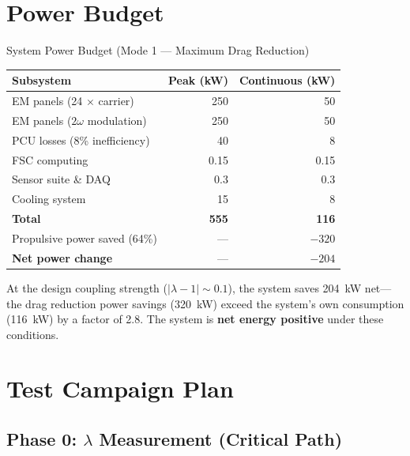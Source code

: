 \documentclass[11pt]{article}
\begin{document}
\section{Power Budget}
\label{sec:power}

\begin{specbox}{System Power Budget (Mode 1 --- Maximum Drag Reduction)}
\begin{tabular}{@{}lrr@{}}
\toprule
\textbf{Subsystem} & \textbf{Peak (kW)} & \textbf{Continuous (kW)} \\
\midrule
EM panels (24 $\times$ carrier) & 250 & 50 \\
EM panels ($2\omega$ modulation) & 250 & 50 \\
PCU losses (8\% inefficiency) & 40 & 8 \\
FSC computing & 0.15 & 0.15 \\
Sensor suite \& DAQ & 0.3 & 0.3 \\
Cooling system & 15 & 8 \\
\midrule
\textbf{Total} & \textbf{555} & \textbf{116} \\
\midrule
Propulsive power saved (64\%) & --- & $-320$ \\
\textbf{Net power change} & --- & \textbf{$-204$} \\
\bottomrule
\end{tabular}
\end{specbox}

\begin{keyresult}
At the design coupling strength ($|\lambda - 1| \sim 0.1$), the system
saves 204~kW net---the drag reduction power savings (320~kW) exceed the
system's own consumption (116~kW) by a factor of 2.8. The system is
\textbf{net energy positive} under these conditions.
\end{keyresult}

\section{Test Campaign Plan}
\label{sec:test_campaign}

\subsection{Phase 0: $\lambda$ Measurement (Critical Path)}
\end{document}
